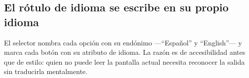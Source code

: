 \subsection{El rótulo de idioma se escribe en su propio idioma}

El selector nombra cada opción con su endónimo ---\enquote{Español} y \enquote{English}--- y marca cada botón con su atributo de idioma. La razón es de accesibilidad antes que de estilo: quien no puede leer la pantalla actual necesita reconocer la salida sin traducirla mentalmente.

